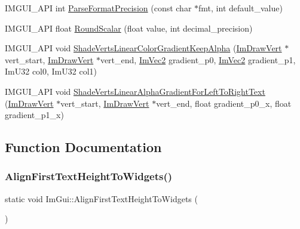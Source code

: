 \begin{DoxyCompactItemize}
\item 
I\+M\+G\+U\+I\+\_\+\+A\+PI int \hyperlink{namespace_im_gui_a40943047a2f8cad978fabffcbd26805f}{Parse\+Format\+Precision} (const char $\ast$fmt, int default\+\_\+value)
\item 
I\+M\+G\+U\+I\+\_\+\+A\+PI float \hyperlink{namespace_im_gui_ab1826c569a8f3296b9723a2148013d28}{Round\+Scalar} (float value, int decimal\+\_\+precision)
\item 
I\+M\+G\+U\+I\+\_\+\+A\+PI void \hyperlink{namespace_im_gui_a7880876c5072e610be8f8e898d2a8866}{Shade\+Verts\+Linear\+Color\+Gradient\+Keep\+Alpha} (\hyperlink{struct_im_draw_vert}{Im\+Draw\+Vert} $\ast$vert\+\_\+start, \hyperlink{struct_im_draw_vert}{Im\+Draw\+Vert} $\ast$vert\+\_\+end, \hyperlink{struct_im_vec2}{Im\+Vec2} gradient\+\_\+p0, \hyperlink{struct_im_vec2}{Im\+Vec2} gradient\+\_\+p1, Im\+U32 col0, Im\+U32 col1)
\item 
I\+M\+G\+U\+I\+\_\+\+A\+PI void \hyperlink{namespace_im_gui_a73b4d230c8fffd2a07d799cd9d4e2a03}{Shade\+Verts\+Linear\+Alpha\+Gradient\+For\+Left\+To\+Right\+Text} (\hyperlink{struct_im_draw_vert}{Im\+Draw\+Vert} $\ast$vert\+\_\+start, \hyperlink{struct_im_draw_vert}{Im\+Draw\+Vert} $\ast$vert\+\_\+end, float gradient\+\_\+p0\+\_\+x, float gradient\+\_\+p1\+\_\+x)
\end{DoxyCompactItemize}


\subsection{Function Documentation}
\hypertarget{namespace_im_gui_a0c1fd13ae89c240fb7547e244d672f9b}{}\label{namespace_im_gui_a0c1fd13ae89c240fb7547e244d672f9b} 
\subsubsection{\texorpdfstring{Align\+First\+Text\+Height\+To\+Widgets()}{AlignFirstTextHeightToWidgets()}}
{\footnotesize\ttfamily static void Im\+Gui\+::\+Align\+First\+Text\+Height\+To\+Widgets (\begin{DoxyParamCaption}{ }\end{DoxyParamCaption})\hspace{0.3cm}{\ttfamily [static]}}

\hypertarget{namespace_im_gui_ae14be3a3bec106de7c91aaa2a9a558a1}{}\label{namespace_im_gui_ae14be3a3bec106de7c91aaa2a9a558a1} 
